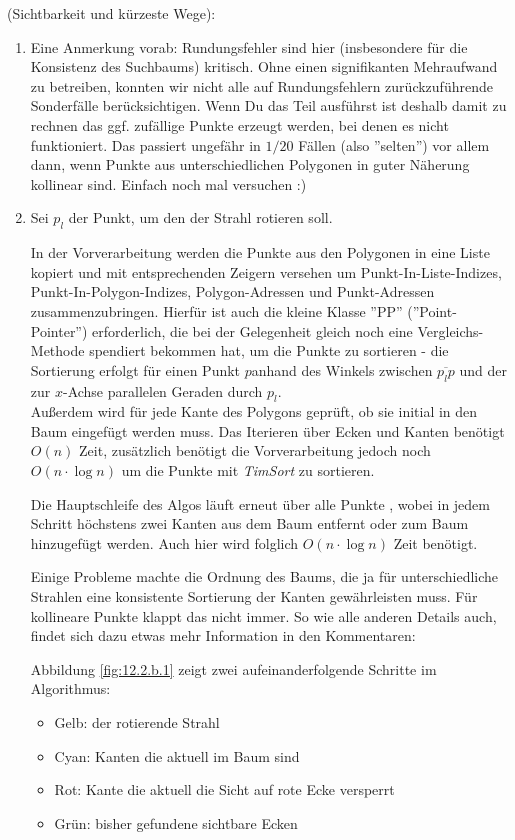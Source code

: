 \documentclass[a4paper, titlepage=false, parskip=full-, 10pt]{scrartcl}
\newcounter{tasknbr}
\newenvironment{task}[1]{{\bf Aufgabe \arabic {tasknbr}\stepcounter{tasknbr}} (#1):\begin{enumerate}}{\end{enumerate}}
\newcommand{\subtask}[1]{\item[#1)]}
\begin{document}
\begin{task}{Sichtbarkeit und kürzeste Wege}
\item[]
Eine Anmerkung vorab: Rundungsfehler sind hier (insbesondere für die Konsistenz des Suchbaums) kritisch. Ohne einen signifikanten Mehraufwand zu betreiben, konnten wir nicht alle auf Rundungsfehlern zurückzuführende Sonderfälle berücksichtigen. Wenn Du das Teil ausführst  ist deshalb damit zu rechnen das ggf. zufällige Punkte erzeugt werden, bei denen es nicht funktioniert. Das passiert ungefähr in $1/20$ Fällen (also ''selten'') vor allem dann, wenn Punkte aus unterschiedlichen Polygonen in guter Näherung kollinear sind. Einfach noch mal versuchen :)

\subtask{a}
Sei $p_l$ der Punkt, um den der Strahl rotieren soll.

In der Vorverarbeitung werden die Punkte aus den Polygonen in eine Liste kopiert und mit entsprechenden Zeigern versehen um Punkt-In-Liste-Indizes, Punkt-In-Polygon-Indizes, Polygon-Adressen und Punkt-Adressen zusammenzubringen. Hierfür ist auch die kleine Klasse ''PP'' (''Point-Pointer'') erforderlich, die bei der Gelegenheit gleich noch eine Vergleichs-Methode spendiert bekommen hat, um die Punkte zu sortieren - die Sortierung erfolgt für einen Punkt $p$anhand des Winkels zwischen $\overline{p_lp}$ und der zur $x$-Achse parallelen Geraden durch $p_l$.\\
Außerdem wird für jede Kante des Polygons geprüft, ob sie initial in den Baum eingefügt werden muss. Das Iterieren über Ecken und Kanten benötigt $O(n)$ Zeit, zusätzlich benötigt die Vorverarbeitung jedoch noch $O(n\cdot\log n)$ um die Punkte mit \emph{TimSort} zu sortieren.

Die Hauptschleife des Algos läuft erneut über alle Punkte , wobei in jedem Schritt höchstens zwei Kanten aus dem Baum entfernt oder zum Baum hinzugefügt werden. Auch hier wird folglich $O(n\cdot\log n)$ Zeit benötigt.

Einige Probleme machte die Ordnung des Baums, die ja für unterschiedliche Strahlen eine konsistente Sortierung der Kanten gewährleisten muss. Für kollineare Punkte klappt das nicht immer. So wie alle anderen Details auch, findet sich dazu etwas mehr Information in den Kommentaren:



Abbildung \ref{fig:12.2.b.1} zeigt zwei aufeinanderfolgende Schritte im Algorithmus:
\begin{itemize}
\item Gelb: der rotierende Strahl
\item Cyan: Kanten die aktuell im Baum sind
\item Rot: Kante die aktuell die Sicht auf rote Ecke versperrt
\item Grün: bisher gefundene sichtbare Ecken
\end{itemize}


\end{task}
\end{document}
